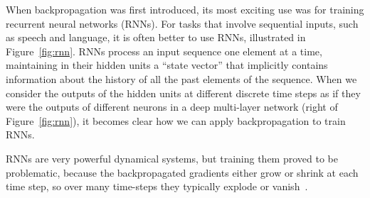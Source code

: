 \documentclass[10pts]{article}
\newcommand{\citep}[1]{\cite{#1}}
\begin{document}
When backpropagation was first introduced, its most exciting use was
for training recurrent neural networks (RNNs). 
For tasks that involve sequential inputs, such as speech and language,
it is often better to use RNNs, illustrated in
Figure~\ref{fig:rnn}.  RNNs process an input
sequence one element at a time, maintaining in their hidden units a
``state vector'' that implicitly contains information about the
history of all the past elements of the sequence.  
When we consider the outputs of
the hidden units at different discrete time steps as if they were the
outputs of different neurons in a deep multi-layer network (right of
Figure~\ref{fig:rnn}), it becomes
clear how we can apply backpropagation to train RNNs.

RNNs are very powerful dynamical systems, but
training them proved to be problematic, because the
backpropagated gradients either grow or shrink at each time step, so
over many time-steps they typically explode or
vanish~\citep{Hochreiter91-small,Bengio-et-al-TNN1994}.
\end{document}
